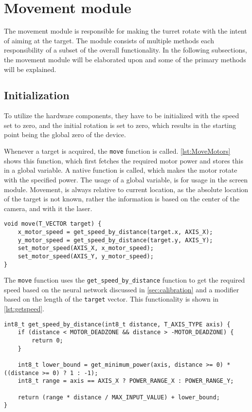 \section{Movement module}
\label{sec:movement}
The movement module is responsible for making the turret rotate with the intent of aiming at the target.
The module consists of multiple methods each responsibility of a subset of the overall functionality.
In the following subsections, the movement module will be elaborated upon and some of the primary methods will be explained.

\subsection{Initialization}
To utilize the hardware components, they have to be initialized with the speed set to zero, and the initial rotation is set to zero, which results in the starting point being the global zero of the device.

Whenever a target is acquired, the \texttt{move} function is called.
\autoref{lst:MoveMotors} shows this function, which first fetches the required motor power and stores this in a global variable.
A native function is called, which makes the motor rotate with the specified power.
The usage of a global variable, is for usage in the screen module.
Movement, is always relative to current location, as the absolute location of the target is not known, rather the information is based on the center of the camera, and with it the laser.

\begin{lstlisting}[language=CSharp,caption={move method from movement.c},label={lst:MoveMotors}]
void move(T_VECTOR target) {
    x_motor_speed = get_speed_by_distance(target.x, AXIS_X);
    y_motor_speed = get_speed_by_distance(target.y, AXIS_Y);
    set_motor_speed(AXIS_X, x_motor_speed);
    set_motor_speed(AXIS_Y, y_motor_speed);
}
\end{lstlisting}


The \texttt{move} function uses the \texttt{get\_speed\_by\_distance} function to get the required speed based on the neural network discussed in \autoref{sec:calibration} and a modifier based on the length of the \texttt{target} vector.
This functionality is shown in \autoref{lst:getspeed}.

\begin{lstlisting}[language=CSharp,caption={get\_speed\_by\_distance method from movement.c},label={lst:getspeed},firstnumber={109}]
int8_t get_speed_by_distance(int8_t distance, T_AXIS_TYPE axis) {
    if (distance < MOTOR_DEADZONE && distance > -MOTOR_DEADZONE) {
        return 0;
    }

    int8_t lower_bound = get_minimum_power(axis, distance >= 0) * ((distance >= 0) ? 1 : -1);
    int8_t range = axis == AXIS_X ? POWER_RANGE_X : POWER_RANGE_Y;

    return (range * distance / MAX_INPUT_VALUE) + lower_bound;
}
\end{lstlisting}


